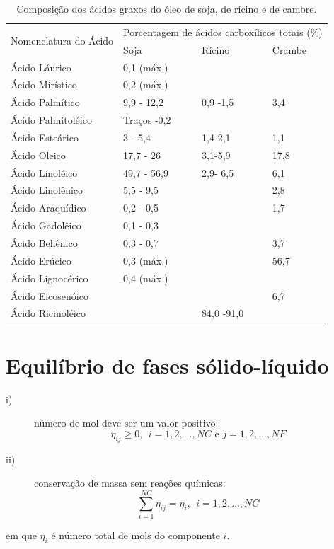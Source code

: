 \lipsum[22-25]
\begin{table}[H]
\centering
\caption{Composição dos ácidos graxos do óleo de soja, de rícino e de cambre.}
\begin{tabular}{lp{2.5cm}p{2.5cm}p{2.5cm}}
\hline
\multirow{2}{*}{Nomenclatura do Ácido} & \multicolumn{3}{l}{Porcentagem de ácidos carboxílicos totais (\%)}  \\
    & Soja  & Rícino & Crambe  \\
    \hline
     Ácido Láurico      & 0,1 (máx.)  &  & \\
     Ácido Mirístico    & 0,2 (máx.)  &  &  \\
     Ácido Palmítico    & 9,9 - 12,2  & 0,9 -1,5 & 3,4  \\
     Ácido Palmitoléico & Traços -0,2 &  &  \\
     Ácido Esteárico    & 3 - 5,4     & 1,4-2,1  & 1,1 \\
     Ácido Oleico       & 17,7 - 26   & 3,1-5,9 & 17,8 \\
     Ácido Linoléico    & 49,7 - 56,9 & 2,9- 6,5 & 6,1 \\
     Ácido Linolênico   & 5,5 - 9,5   &  & 2,8 \\
     Ácido Araquídico   & 0,2 - 0,5   &  & 1,7 \\
     Ácido Gadolêico    & 0,1 - 0,3   &  &  \\
     Ácido Behênico     & 0,3 - 0,7   &  & 3,7 \\
     Ácido Erúcico      & 0,3 (máx.)  &  & 56,7 \\
     Ácido Lignocérico  & 0,4 (máx.)  &  &  \\
     Ácido Eicosenóico  &             &  & 6,7 \\
     Ácido Ricinoléico  &             & 84,0 -91,0 &  \\
     \hline
\end{tabular}
\label{tab:angelica}
\end{table}

\section{Equilíbrio de fases sólido-líquido}
	
\lipsum[13-15] \cite{Prausnitz}
	

	\begin{description}
		\item[i)] número de mol deve ser um valor positivo:
		\begin{equation}
		\eta_{ij}\geqslant 0,\  \ i=1,2,\ldots,NC \mbox{ e } j=1,2,\ldots,NF
		\end{equation}
		\item[ii)] conservação de massa sem reações químicas:
		\begin{equation}
		\sum_{i=1}^{NC}\eta_{ij}=\eta_{i},\  \ i=1,2,\ldots,NC
		\end{equation}
	\end{description}
	em que $\eta_{i}$ é número total de mols do componente $i$.
	\cite{Sandlel,Barbosa2012,Prausnitz}
	
